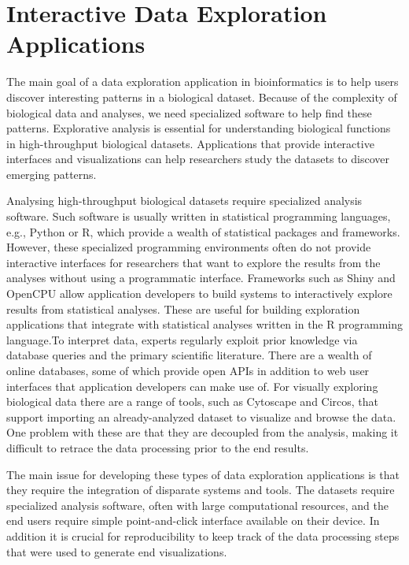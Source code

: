 \chapter{Interactive Data Exploration Applications}\label{interactive}
The main goal of a data exploration application in bioinformatics is to help
users discover interesting patterns in a biological dataset. Because of the
complexity of biological data and analyses, we need specialized software to help
find these patterns. Explorative analysis is essential for understanding
biological functions in high-throughput biological datasets. Applications that
provide interactive interfaces and visualizations can help researchers study the
datasets to discover emerging patterns. 

Analysing high-throughput biological datasets require specialized analysis
software.  Such software is usually written in statistical programming
languages, e.g., Python or R, which provide a wealth of statistical packages and
frameworks. However, these specialized programming environments often do not
provide interactive interfaces for researchers that want to explore the results
from the analyses without using a programmatic interface.  Frameworks such as
Shiny\cite{shiny} and OpenCPU\cite{opencpu} allow application developers to
build systems to interactively explore results from statistical analyses. These
are useful for building exploration applications that integrate with statistical
analyses written in the R programming language.To interpret data, experts
regularly exploit prior knowledge via database queries and the primary
scientific literature. There are a wealth of online databases, some of which
provide open APIs in addition to web user interfaces that application developers
can make use of. For visually exploring biological data there are a range of
tools, such as Cytoscape\cite{cytoscape} and Circos\cite{circos}, that support
importing an already-analyzed dataset to visualize and browse the data. One
problem with these are that they are decoupled from the analysis, making it
difficult to retrace the data processing prior to the end results.  

The main issue for developing these types of data exploration applications is
that they require the integration of disparate systems and tools. The datasets
require specialized analysis software, often with large computational resources,
and the end users require simple point-and-click interface available on their
device. In addition it is crucial for reproducibility to keep track of the 
data processing steps that were used to generate end visualizations. 

